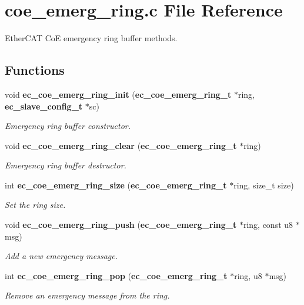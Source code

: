 \section{coe\-\_\-emerg\-\_\-ring.\-c File Reference}
\label{coe__emerg__ring_8c}


Ether\-C\-A\-T Co\-E emergency ring buffer methods.  


\subsection*{Functions}
\begin{DoxyCompactItemize}
\item 
void {\bf ec\-\_\-coe\-\_\-emerg\-\_\-ring\-\_\-init} ({\bf ec\-\_\-coe\-\_\-emerg\-\_\-ring\-\_\-t} $\ast$ring, {\bf ec\-\_\-slave\-\_\-config\-\_\-t} $\ast$sc)
\begin{DoxyCompactList}\small\item\em Emergency ring buffer constructor. \end{DoxyCompactList}\item 
void {\bf ec\-\_\-coe\-\_\-emerg\-\_\-ring\-\_\-clear} ({\bf ec\-\_\-coe\-\_\-emerg\-\_\-ring\-\_\-t} $\ast$ring)
\begin{DoxyCompactList}\small\item\em Emergency ring buffer destructor. \end{DoxyCompactList}\item 
int {\bf ec\-\_\-coe\-\_\-emerg\-\_\-ring\-\_\-size} ({\bf ec\-\_\-coe\-\_\-emerg\-\_\-ring\-\_\-t} $\ast$ring, size\-\_\-t size)
\begin{DoxyCompactList}\small\item\em Set the ring size. \end{DoxyCompactList}\item 
void {\bf ec\-\_\-coe\-\_\-emerg\-\_\-ring\-\_\-push} ({\bf ec\-\_\-coe\-\_\-emerg\-\_\-ring\-\_\-t} $\ast$ring, const u8 $\ast$msg)
\begin{DoxyCompactList}\small\item\em Add a new emergency message. \end{DoxyCompactList}\item 
int {\bf ec\-\_\-coe\-\_\-emerg\-\_\-ring\-\_\-pop} ({\bf ec\-\_\-coe\-\_\-emerg\-\_\-ring\-\_\-t} $\ast$ring, u8 $\ast$msg)
\begin{DoxyCompactList}\small\item\em Remove an emergency message from the ring. \end{DoxyCompactList}\item 

\end{DoxyCompactItemize}
